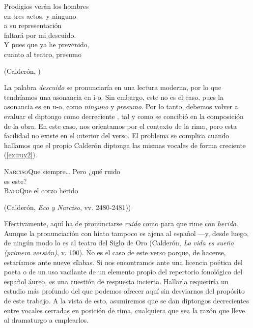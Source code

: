 \begin{exe}\ex\label{ex:ruy}Prodigios verán los hombres\\
en tres actos, y ninguno\\
a su representación\\
faltará por mi descuido.\\
Y pues que ya he prevenido,\\
cuanto al teatro, presumo\\\strut\hfill(Calderón, )\end{exe}
La palabra \textit{descuido} se pronunciaría  en una lectura moderna, por lo que tendríamos una asonancia en i-o. Sin embargo, este no es el caso, pues la asonancia es en u-o, como \textit{ninguno} y \textit{presumo}. Por lo tanto, debemos volver a evaluar el diptongo como decreciente , tal y como se concibió en la composición de la obra. En este caso, nos orientamos por el contexto de la rima, pero esta facilidad no existe en el interior del verso. El problema se complica cuando hallamos que el propio Calderón diptonga las mismas vocales de forma creciente (\ref{ex:ruy2}).

\begin{exe}\ex\label{ex:ruy2}\textsc{Narciso}\tabto{7em}Que siempre… Pero ¿qué ruido\\
\tabto{7em}es este?\\
\textsc{Bato}\tabto{12em}Que el corzo herido\\\strut\hfill(Calderón, \textit{Eco y Narciso}, vv. 2480-2481)\nocite{calderon_econarciso})\end{exe}
Efectivamente, aquí ha de pronunciarse \textit{ruido} como  para que rime con \textit{herido}. Aunque la pronunciación con hiato  tampoco es ajena al español —y, desde luego, de ningún modo lo es al teatro del Siglo de Oro (Calderón, \textit{La vida es sueño (primera versión)}, v. 100\nocite{calderon_vidasuenno}){\textemdash.} No es el caso de este verso porque, de hacerse, estaríamos ante nueve sílabas. Si nos encontramos ante una licencia poética del poeta o de un uso vacilante de un elemento propio del repertorio fonológico del español áureo, es una cuestión de respuesta incierta. Hallarla requeriría un estudio más profundo del que podemos ofrecer aquí sin desviarnos del propósito de este trabajo. A la vista de esto, asumiremos que se dan diptongos decrecientes entre vocales cerradas en posición de rima, cualquiera que sea la razón que lleve al dramaturgo a emplearlos.


